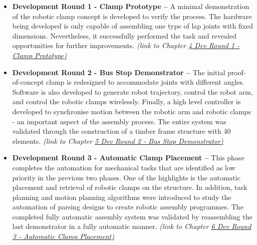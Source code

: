 \begin{itemize}
    
    \item \textbf{Development Round 1 - Clamp Prototype --} A minimal demonstration of the robotic clamp concept is developed to verify the process. The hardware being developed is only capable of assembling one type of lap joints with fixed dimensions. Nevertheless, it successfully performed the task and revealed opportunities for further improvements. \textit{(link to Chapter \ul{4 Dev Round 1 - Clamp Prototype)}}
    
    \item \textbf{Development Round 2 - Bus Stop Demonstrator --} The initial proof-of-concept clamp is redesigned to accommodate joints with different angles. Software is also developed to generate robot trajectory, control the robot arm, and control the robotic clamps wirelessly. Finally, a high level controller is developed to synchronise motion between the robotic arm and robotic clamps - an important aspect of the assembly process. The entire system was validated through the construction of a timber frame structure with 40 elements. \textit{(link to Chapter \ul{5 Dev Round 2 - Bus Stop Demonstrator)}}
    
    \item \textbf{Development Round 3 - Automatic Clamp Placement --} This phase completes the automation for mechanical tasks that are identified as low priority in the previous two phases. One of the highlights is the automatic placement and retrieval of robotic clamps on the structure. In addition, task planning and motion planning algorithms were introduced to study the automation of parsing designs to create robotic assembly programmes. The completed fully automatic assembly system was validated by reassembling the last demonstrator in a fully automatic manner.  \textit{(link to Chapter \ul{6 Dev Round 3 - Automatic Clamp Placement)}}
 

\end{itemize}
